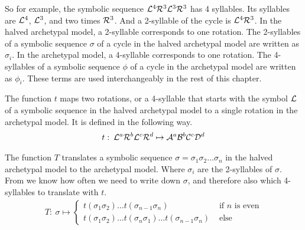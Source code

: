 So for example, the symbolic sequence $\mathcal{L}^4\mathcal{R}^3\mathcal{L}^3\mathcal{R}^3$ has 4 syllables.
Its syllables are $\mathcal{L}^4$, $\mathcal{L}^3$, and two times $\mathcal{R}^3$.
And a 2-syllable of the cycle is $\mathcal{L}^4\mathcal{R}^3$.
In the halved archetypal model, a 2-syllable corresponds to one rotation.
The 2-syllables of a symbolic sequence $\sigma$ of a cycle in the halved archetypal model are written as $\sigma_i$.
In the archetypal model, a 4-syllable corresponds to one rotation.
The 4-syllables of a symbolic sequence $\phi$ of a cycle in the archetypal model are written as $\phi_i$.
These terms are used interchangeably in the rest of this chapter.

\begin{definition}
	\label{def:t}
	The function $t$ maps two rotations, or a 4-syllable that starts with the symbol $\mathcal{L}$ of a symbolic sequence in the halved archetypal model to a single rotation in the archetypal model.
	It is defined in the following way.
	\begin{align}
		t:\: \mathcal{L}^a\mathcal{R}^b\mathcal{L}^c\mathcal{R}^d \mapsto \mathcal{A}^a\mathcal{B}^b\mathcal{C}^c\mathcal{D}^d
	\end{align}
\end{definition}

\begin{definition}
	\label{def:T}
	The function $T$ translates a symbolic sequence $\sigma = \sigma_1\sigma_2 \dots \sigma_n$ in the halved archetypal model to the archetypal model.
	Where $\sigma_i$ are the 2-syllables of $\sigma$.
	From  we know how often we need to write down $\sigma$, and therefore also which 4-syllables to translate with $t$.
	\begin{align}
		T:\: \sigma \mapsto \begin{cases}
			                    t(\sigma_1\sigma_2) \dots t(\sigma_{n-1}\sigma_n)                           & \text{ if $n$ is even} \\
			                    t(\sigma_1\sigma_2) \dots t(\sigma_n\sigma_1) \dots t(\sigma_{n-1}\sigma_n) & \text{ else}
		                    \end{cases}
	\end{align}
\end{definition}

